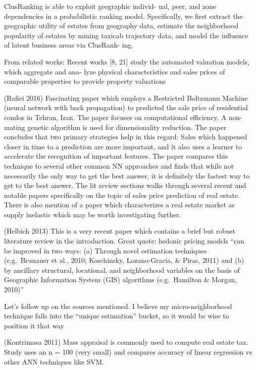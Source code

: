 \documentclass[]{article}
\begin{document}
ClusRanking is able to exploit geographic individ- ual, peer, and zone
dependencies in a probabilistic ranking model. Specifically, we first
extract the geographic utility of estates from geography data, estimate
the neighborhood popularity of estates by mining taxicab trajectory
data, and model the influence of latent business areas via ClusRank-
ing.

From related works: Recent works {[}8, 21{]} study the automated
valuation models, which aggregate and ana- lyze physical characteristics
and sales prices of comparable properties to provide property valuations

(Rafiei 2016) Fascinating paper which employs a Restricted Boltzmann
Machine (neural network with back propagation) to predicted the sale
price of residential condos in Tehran, Iran. The paper focuses on
computational efficiency. A non-mating genetic algorithm is used for
dimensionality reduction. The paper concludes that two primary
strategies help in this regard: Sales which happened closer in time to a
prediction are more important, and it also uses a learner to accelerate
the recognition of important features. The paper compares this technique
to several other common NN approaches and finds that while not
necessarily the only way to get the best answer, it is definitely the
fastest way to get to the best answer. The lit review sections walks
through several recent and notable papers specifically on the topic of
sales price prediction of real estate. There is also mention of a paper
which characterizes a real estate market as supply inelastic which may
be worth investigating further.

(Helbich 2013) This is a very recent paper which contains a brief but
robust literature review in the introduction. Great quote: hedonic
pricing models ``can be improved in two ways: (a) Through novel
estimation techniques (e.g.~Brunauer et al., 2010; Koschinsky,
Lozano-Gracia, \& Piras, 2011) and (b) by ancillary structural,
locational, and neighborhood variables on the basis of Geographic
Information System (GIS) algorithms (e.g.~Hamilton \& Morgan, 2010)''

Let's follow up on the sources mentioned. I believe my
micro-neighborhood technique falls into the ``unique estimation''
bucket, so it would be wise to position it that way

(Kontrimasa 2011) Mass appraisal is commonly used to compute real estate
tax. Study uses an n = 100 (very small) and compares accuracy of linear
regression vs other ANN techniques like SVM.
\end{document}
